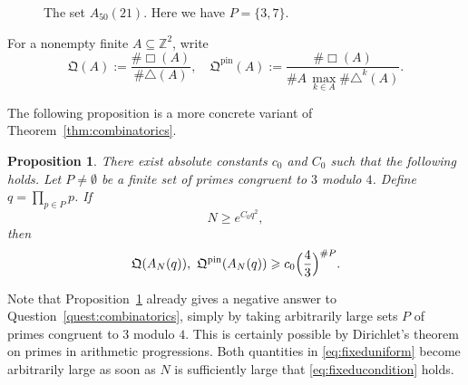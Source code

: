 \documentclass[11pt,reqno]{amsart}
\newtheorem{proposition}[theorem]{Proposition}
\numberwithin{equation}{section}
\renewcommand{\geq}{\geqslant}
\begin{document}
\begin{figure}
\begin{center}
\hspace*{7mm}
\end{center}
\caption{The set $A_{50}(21)$. Here we have $P=\{3,7\}$.}
\label{fig:rec_tri_set_A}
\end{figure}

For a nonempty finite $A\subseteq\mathbb{Z}^2$, write
\[ \mathfrak{Q}(A):=\frac{\#\Box(A)}{\#\triangle(A)},
\quad \mathfrak{Q}^{\mathrm{pin}}(A):=
\frac{\#\Box(A)}{\#A\,\max_{k\in A}\limits \#\triangle^k(A)}. \]

The following proposition is a more concrete variant of Theorem~\ref{thm:combinatorics}.

\begin{proposition}\label{prop:fixedmodulus}
There exist absolute constants $c_0$ and $C_0$ such that the following holds. Let $P\neq\emptyset$ be a finite set of primes congruent to $3$ modulo $4$. Define $q=\prod_{p\in P}p$. If
\begin{equation}\label{eq:fixeducondition}
N\geq e^{C_0 q^2},
\end{equation}
then
\begin{equation}\label{eq:fixeduniform}
\mathfrak{Q}(A_N(q)),\ \mathfrak{Q}^{\mathrm{pin}}(A_N(q))
\geq c_0 \Bigl(\frac{4}{3}\Bigr)^{\#P}.
\end{equation}
\end{proposition}

Note that Proposition~\ref{prop:fixedmodulus} already gives a negative answer to Question~\ref{quest:combinatorics}, simply by taking arbitrarily large sets $P$ of primes congruent to $3$ modulo $4$. This is certainly possible by Dirichlet's theorem on primes in arithmetic progressions. Both quantities in \eqref{eq:fixeduniform} become arbitrarily large as soon as $N$ is sufficiently large that \eqref{eq:fixeducondition} holds.
\end{document}
